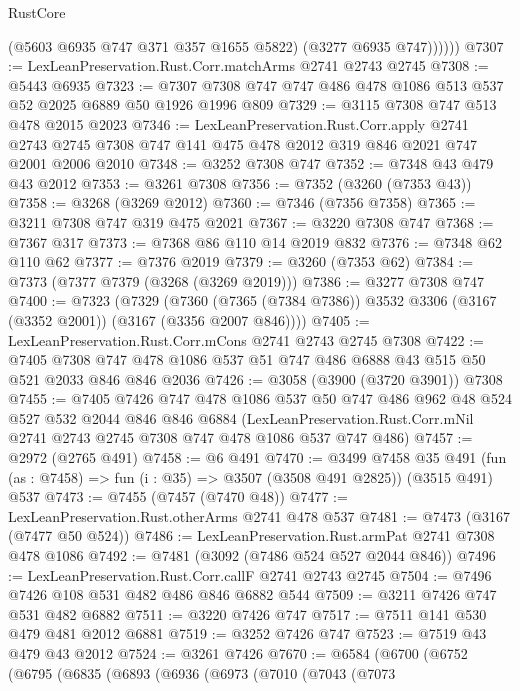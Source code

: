 \begin{lexlean}{RustCore}
\begin{coremodule}
              (@5603 @6935 @747 @371 @357 @1655 @5822)
              (@3277 @6935 @747))))))
@7307 := LexLeanPreservation.Rust.Corr.matchArms @2741 @2743 @2745
@7308 := @5443 @6935
@7323 := @7307 @7308 @747 @747 @486 @478 @1086 @513 @537 @52 @2025 @6889 @50 @1926 @1996 @809
@7329 := @3115 @7308 @747 @513 @478 @2015 @2023
@7346 := LexLeanPreservation.Rust.Corr.apply
    @2741
    @2743
    @2745
    @7308
    @747
    @141
    @475
    @478
    @2012
    @319
    @846
    @2021
    @747
    @2001
    @2006
    @2010
@7348 := @3252 @7308 @747
@7352 := @7348 @43 @479 @43 @2012
@7353 := @3261 @7308
@7356 := @7352 (@3260 (@7353 @43))
@7358 := @3268 (@3269 @2012)
@7360 := @7346 (@7356 @7358)
@7365 := @3211 @7308 @747 @319 @475 @2021
@7367 := @3220 @7308 @747
@7368 := @7367 @317
@7373 := @7368 @86 @110 @14 @2019 @832
@7376 := @7348 @62 @110 @62
@7377 := @7376 @2019
@7379 := @3260 (@7353 @62)
@7384 := @7373 (@7377 @7379 (@3268 (@3269 @2019)))
@7386 := @3277 @7308 @747
@7400 := @7323
    (@7329
      (@7360 (@7365 (@7384 @7386)) @3532 @3306 (@3167 (@3352 @2001)) (@3167 (@3356 @2007 @846))))
@7405 := LexLeanPreservation.Rust.Corr.mCons @2741 @2743 @2745 @7308
@7422 := @7405
    @7308
    @747
    @478
    @1086
    @537
    @51
    @747
    @486
    @6888
    @43
    @515
    @50
    @521
    @2033
    @846
    @846
    @2036
@7426 := @3058 (@3900 (@3720 @3901)) @7308
@7455 := @7405
    @7426
    @747
    @478
    @1086
    @537
    @50
    @747
    @486
    @962
    @48
    @524
    @527
    @532
    @2044
    @846
    @846
    @6884
    (LexLeanPreservation.Rust.Corr.mNil @2741 @2743 @2745 @7308 @747 @478 @1086 @537 @747 @486)
@7457 := @2972 (@2765 @491)
@7458 := @6 @491
@7470 := @3499
    @7458
    @35
    @491
    (fun (as : @7458) => fun (i : @35) => @3507 (@3508 @491 @2825))
    (@3515 @491)
    @537
@7473 := @7455 (@7457 (@7470 @48))
@7477 := LexLeanPreservation.Rust.otherArms @2741 @478 @537
@7481 := @7473 (@3167 (@7477 @50 @524))
@7486 := LexLeanPreservation.Rust.armPat @2741 @7308 @478 @1086
@7492 := @7481 (@3092 (@7486 @524 @527 @2044 @846))
@7496 := LexLeanPreservation.Rust.Corr.callF @2741 @2743 @2745
@7504 := @7496 @7426 @108 @531 @482 @486 @846 @6882 @544
@7509 := @3211 @7426 @747 @531 @482 @6882
@7511 := @3220 @7426 @747
@7517 := @7511 @141 @530 @479 @481 @2012 @6881
@7519 := @3252 @7426 @747
@7523 := @7519 @43 @479 @43 @2012
@7524 := @3261 @7426
@7670 := @6584
    (@6700
      (@6752
        (@6795
          (@6835
            (@6893
              (@6936
                (@6973
                  (@7010
                    (@7043
                      (@7073

\end{coremodule}
\end{lexlean}
